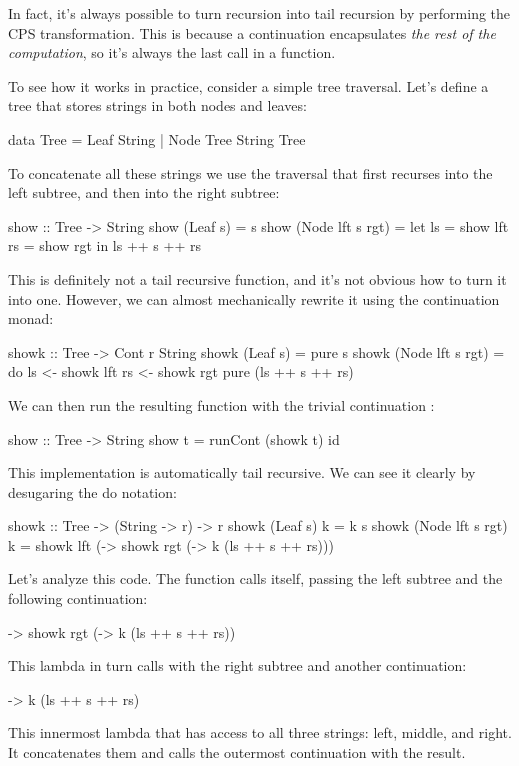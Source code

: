 \documentclass[DaoFP]{subfiles}
\begin{document}
In fact, it's always possible to turn recursion into tail recursion by performing the CPS transformation. This is because a continuation encapsulates \emph{the rest of the computation}, so it's always the last call in a function. 

To see how it works in practice, consider a simple tree traversal. Let's define a tree that stores strings in both nodes and leaves:
\begin{haskell}
data Tree = Leaf String 
          | Node Tree String Tree
\end{haskell}
To concatenate all these strings we use the traversal that first recurses into the left subtree, and then into the right subtree:
\begin{haskell}
show :: Tree -> String
show (Leaf s) = s
show (Node lft s rgt) =
  let ls = show lft
      rs = show rgt
  in ls ++ s ++ rs
\end{haskell}
This is definitely not a tail recursive function, and it's not obvious how to turn it into one. However, we can almost mechanically rewrite it using the continuation monad:
\begin{haskell}
showk :: Tree -> Cont r String
showk (Leaf s) = pure s
showk (Node lft s rgt) = do
  ls <- showk lft
  rs <- showk rgt
  pure (ls ++ s ++ rs)
 \end{haskell}
We can then run the resulting function with the trivial continuation :
\begin{haskell}
show :: Tree -> String
show t = runCont (showk t) id
\end{haskell}

This implementation is automatically tail recursive. We can see it clearly by desugaring the do notation:
\begin{haskell}
showk :: Tree -> (String -> r) -> r
showk (Leaf s) k = k s
showk (Node lft s rgt) k =
  showk lft (\ls -> 
    showk rgt (\rs -> 
      k (ls ++ s ++ rs)))
\end{haskell}
Let's analyze this code. The function calls itself, passing the left subtree  and the following continuation:
\begin{haskell}
\ls -> 
    showk rgt (\rs -> 
      k (ls ++ s ++ rs))
\end{haskell}
This lambda in turn calls  with the right subtree  and another continuation:
\begin{haskell}
\rs -> k (ls ++ s ++ rs)
\end{haskell}
This innermost lambda that has access to all three strings: left, middle, and right. It concatenates them and calls the outermost continuation  with the result.
\end{document}
